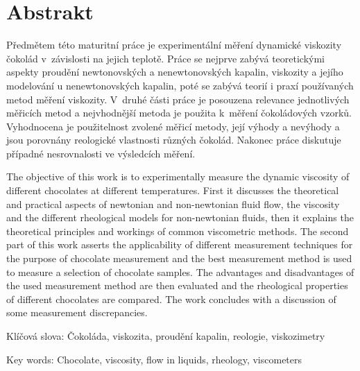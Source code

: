 \documentclass[12pt]{article}
\begin{document}
\pagestyle{empty}

\addtocounter{page}{4}
\newpage
\section*{Abstrakt}
Předmětem této maturitní práce je experimentální měření dynamické viskozity čokolád v~závislosti na jejich teplotě. Práce se nejprve zabývá teoretickými aspekty proudění newtonovských a nenewtonovských kapalin, viskozity a jejího modelování u nenewtonovských kapalin, poté se zabývá teorií i praxí používaných metod měření viskozity. V~druhé části práce je posouzena relevance jednotlivých měřicích metod a nejvhodnější metoda je použita k~měření čokoládových vzorků. Vyhodnocena je použitelnost zvolené měřicí metody, její výhody a nevýhody a jsou porovnány reologické vlastnosti různých čokolád. Nakonec práce diskutuje případné nesrovnalosti ve výsledcích měření.
\par\medskip\noindent
The objective of this work is to experimentally measure the dynamic viscosity of different chocolates at different temperatures. First it discusses the theoretical and practical aspects of newtonian and non-newtonian fluid flow, the viscosity and the different rheological models for non-newtonian fluids, then it explains the theoretical principles and workings of common viscometric methods. The second part of this work asserts the applicability of different measurement techniques for the purpose of chocolate measurement and the best measurement method is used to measure a selection of chocolate samples. The advantages and disadvantages of the used measurement method are then evaluated and the rheological properties of different chocolates are compared. The work concludes with a discussion of some measurement discrepancies.

\par
 \medskip

\par
 \medskip
 Klíčová slova: Čokoláda, viskozita, proudění kapalin, reologie, viskozimetry
 \par
 \medskip
Key words: Chocolate, viscosity, flow in liquids, rheology, viscometers




\newpage


\newpage

\tableofcontents
\newpage

\pagestyle{plain}

\end{document}
